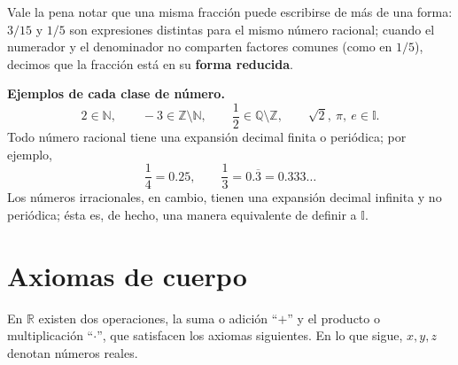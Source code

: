 \documentclass[12pt,a4paper]{book}
\begin{document}
  Vale la pena notar que una misma fracción puede escribirse de más de una forma: $3/15$ y $1/5$ son expresiones distintas para el mismo número racional; cuando el numerador y el denominador no comparten factores comunes (como en $1/5$), decimos que la fracción está en su \textbf{forma reducida}.
  
  \begin{ejemplo}
    \textbf{Ejemplos de cada clase de número.}
    \begin{equation*}
      2\in\mathbb{N}, \qquad -3\in\mathbb{Z}\setminus\mathbb{N}, \qquad \frac{1}{2}\in\mathbb{Q}\setminus\mathbb{Z}, \qquad \sqrt{2},\ \pi,\ e \in\mathbb{I}.
    \end{equation*}
    Todo número racional tiene una expansión decimal finita o periódica; por ejemplo,
    \begin{equation*}
      \frac{1}{4}=0.25, \qquad \frac{1}{3}=0.\overline{3}=0.333\ldots
    \end{equation*}
    Los números irracionales, en cambio, tienen una expansión decimal infinita y no periódica; ésta es, de hecho, una manera equivalente de definir a $\mathbb{I}$.
  \end{ejemplo}
  
  \section{Axiomas de cuerpo}
  
  En $\mathbb{R}$ existen dos operaciones, la suma o adición ``$+$'' y el producto o multiplicación ``$\cdot$'', que satisfacen los axiomas siguientes. En lo que sigue, $x,y,z$ denotan números reales.
  
\end{document}
